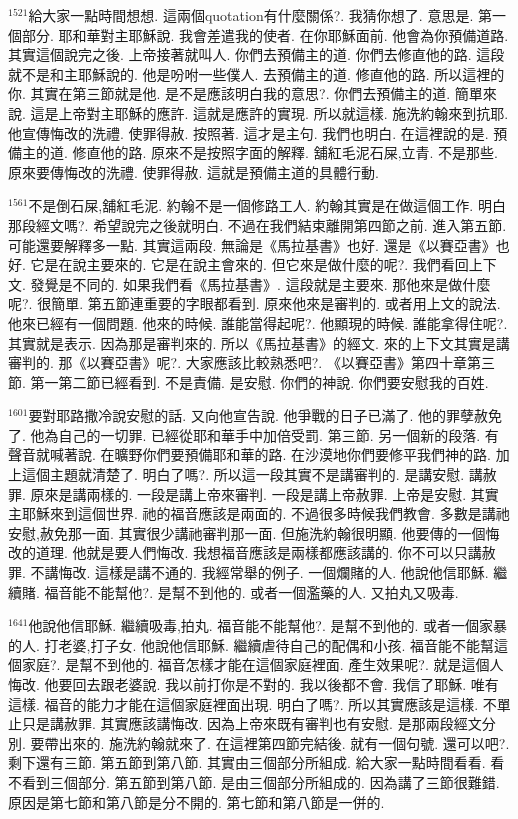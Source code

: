 \documentclass{book}
\begin{document}
$^{1521}$給大家一點時間想想.
這兩個quotation有什麼關係?.
我猜你想了.
意思是.
第一個部分.
耶和華對主耶穌說.
我會差遣我的使者.
在你耶穌面前.
他會為你預備道路.
其實這個說完之後.
上帝接著就叫人.
你們去預備主的道.
你們去修直他的路.
這段就不是和主耶穌說的.
他是吩咐一些僕人.
去預備主的道.
修直他的路.
所以這裡的你.
其實在第三節就是他.
是不是應該明白我的意思?.
你們去預備主的道.
簡單來說.
這是上帝對主耶穌的應許.
這就是應許的實現.
所以就這樣.
施洗約翰來到抗耶.
他宣傳悔改的洗禮.
使罪得赦.
按照著.
這才是主句.
我們也明白.
在這裡說的是.
預備主的道.
修直他的路.
原來不是按照字面的解釋.
舖紅毛泥石屎,立青.
不是那些.
原來要傳悔改的洗禮.
使罪得赦.
這就是預備主道的具體行動.

$^{1561}$不是倒石屎,舖紅毛泥.
約翰不是一個修路工人.
約翰其實是在做這個工作.
明白那段經文嗎?.
希望說完之後就明白.
不過在我們結束離開第四節之前.
進入第五節.
可能還要解釋多一點.
其實這兩段.
無論是《馬拉基書》也好.
還是《以賽亞書》也好.
它是在說主要來的.
它是在說主會來的.
但它來是做什麼的呢?.
我們看回上下文.
發覺是不同的.
如果我們看《馬拉基書》.
這段就是主要來.
那他來是做什麼呢?.
很簡單.
第五節連重要的字眼都看到.
原來他來是審判的.
或者用上文的說法.
他來已經有一個問題.
他來的時候.
誰能當得起呢?.
他顯現的時候.
誰能拿得住呢?.
其實就是表示.
因為那是審判來的.
所以《馬拉基書》的經文.
來的上下文其實是講審判的.
那《以賽亞書》呢?.
大家應該比較熟悉吧?.
《以賽亞書》第四十章第三節.
第一第二節已經看到.
不是責備.
是安慰.
你們的神說.
你們要安慰我的百姓.

$^{1601}$要對耶路撒冷說安慰的話.
又向他宣告說.
他爭戰的日子已滿了.
他的罪孽赦免了.
他為自己的一切罪.
已經從耶和華手中加倍受罰.
第三節.
另一個新的段落.
有聲音就喊著說.
在曠野你們要預備耶和華的路.
在沙漠地你們要修平我們神的路.
加上這個主題就清楚了.
明白了嗎?.
所以這一段其實不是講審判的.
是講安慰.
講赦罪.
原來是講兩樣的.
一段是講上帝來審判.
一段是講上帝赦罪.
上帝是安慰.
其實主耶穌來到這個世界.
祂的福音應該是兩面的.
不過很多時候我們教會.
多數是講祂安慰,赦免那一面.
其實很少講祂審判那一面.
但施洗約翰很明顯.
他要傳的一個悔改的道理.
他就是要人們悔改.
我想福音應該是兩樣都應該講的.
你不可以只講赦罪.
不講悔改.
這樣是講不通的.
我經常舉的例子.
一個爛賭的人.
他說他信耶穌.
繼續賭.
福音能不能幫他?.
是幫不到他的.
或者一個濫藥的人.
又拍丸又吸毒.

$^{1641}$他說他信耶穌.
繼續吸毒,拍丸.
福音能不能幫他?.
是幫不到他的.
或者一個家暴的人.
打老婆,打子女.
他說他信耶穌.
繼續虐待自己的配偶和小孩.
福音能不能幫這個家庭?.
是幫不到他的.
福音怎樣才能在這個家庭裡面.
產生效果呢?.
就是這個人悔改.
他要回去跟老婆說.
我以前打你是不對的.
我以後都不會.
我信了耶穌.
唯有這樣.
福音的能力才能在這個家庭裡面出現.
明白了嗎?.
所以其實應該是這樣.
不單止只是講赦罪.
其實應該講悔改.
因為上帝來既有審判也有安慰.
是那兩段經文分別.
要帶出來的.
施洗約翰就來了.
在這裡第四節完結後.
就有一個句號.
還可以吧?.
剩下還有三節.
第五節到第八節.
其實由三個部分所組成.
給大家一點時間看看.
看不看到三個部分.
第五節到第八節.
是由三個部分所組成的.
因為講了三節很難錯.
原因是第七節和第八節是分不開的.
第七節和第八節是一併的.
\end{document}
